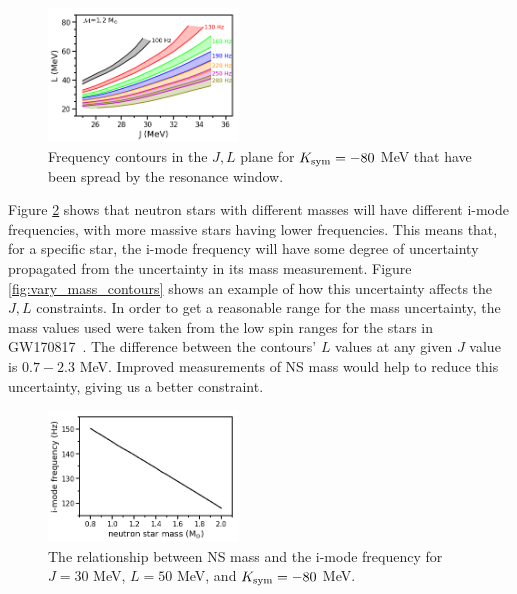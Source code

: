 \documentclass[fleqn,usenatbib]{mnras}
\begin{document}
\begin{figure}
\centering
\includegraphics[width=0.45\textwidth,angle=0]{JL_spread_due_to_df_grid_nonucl.png}
\caption{Frequency contours in the $J,L$ plane for $K_{\rm sym}=-80$ MeV that have been spread by the resonance window.}
\label{fig:t_res_spread}
\end{figure}

\hspace{\parindent}Figure \ref{fig:M_vs_f} shows that neutron stars with different masses will have different i-mode frequencies, with more massive stars having lower frequencies. This means that, for a specific star, the i-mode frequency will have some degree of uncertainty propagated from the uncertainty in its mass measurement. Figure \ref{fig:vary_mass_contours} shows an example of how this uncertainty affects the $J,L$ constraints. In order to get a reasonable range for the mass uncertainty, the mass values used were taken from the low spin ranges for the stars in GW170817~\citet{abbott2017merger}. The difference between the contours' $L$ values at any given $J$ value is $0.7-2.3$ MeV. Improved measurements of NS mass would help to reduce this uncertainty, giving us a better constraint.

\begin{figure}
\centering
\includegraphics[width=0.45\textwidth,angle=0]{M_vs_f_30_50_-80.png}
\caption{The relationship between NS mass and the i-mode frequency for $J=30$ MeV, $L=50$ MeV, and $K_{\rm sym}=-80$ MeV.}
\label{fig:M_vs_f}
\end{figure}
\end{document}
